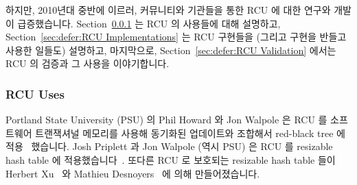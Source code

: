 하지만, 2010년대 중반에 이르러, 커뮤니티와 기관들을 통한 RCU 에 대한 연구와
개발이 급증했습니다.
Section~\ref{sec:defer:RCU Uses} 는 RCU 의 사용들에 대해 설명하고,
Section~\ref{sec:defer:RCU Implementations} 는 RCU 구현들을 (그리고 구현을
반들고 사용한 일들도) 설명하고, 마지막으로,
Section~\ref{sec:defer:RCU Validation} 에서는 RCU 의 검증과 그 사용을
이야기합니다.
\iffalse

However, in the mid 2010s, there was a welcome upsurge in RCU research
and development across a number of communities and institutions.
Section~\ref{sec:defer:RCU Uses} describes uses of RCU,
Section~\ref{sec:defer:RCU Implementations} describes RCU implementations
(as well as work that both creates and uses an implementation),
and finally,
Section~\ref{sec:defer:RCU Validation} describes verification and validation
of RCU and its uses.
\fi

\subsubsection{RCU Uses}
\label{sec:defer:RCU Uses}

Portland State University (PSU) 의 Phil Howard 와 Jon Walpole 은 RCU 를
소프트웨어 트랜잭셔널 메모리를 사용해 동기화된 업데이트와 조합해서 red-black
tree 에 적용~\cite{PhilHowardPhD,PhilHoward2011RCUTMRBTree} 했습니다.
Josh Priplett 과 Jon Walpole (역시 PSU) 은 RCU 를 resizable hash table 에
적용했습니다~\cite{JoshTriplettPhD,Triplett:2011:RPHash,JonCorbet2014RCUhash1,JonCorbet2014RCUhash2}.
또다른 RCU 로 보호되는 resizable hash table 들이 Herbert
Xu~\cite{HerbertXu2010RCUResizeHash} 와 Mathieu
Desnoyers~\cite{PaulMcKenney2013LWNURCUhash} 에 의해 만들어졌습니다.
\iffalse

Phil Howard and Jon Walpole of Portland State University (PSU) have
applied RCU to red-black
trees~\cite{PhilHowardPhD,PhilHoward2011RCUTMRBTree} combined with updates
synchronized using software transactional memory.
Josh Triplett and Jon Walpole (again of PSU) applied RCU to resizable
hash tables~\cite{JoshTriplettPhD,Triplett:2011:RPHash,JonCorbet2014RCUhash1,JonCorbet2014RCUhash2}.
Other RCU-protected resizable hash tables have been created by
Herbert Xu~\cite{HerbertXu2010RCUResizeHash} and by
Mathieu Desnoyers~\cite{PaulMcKenney2013LWNURCUhash}.
\fi

